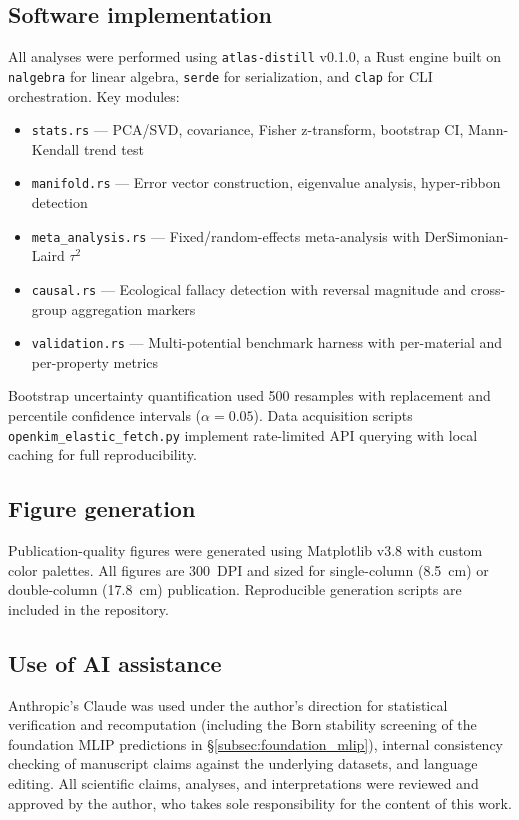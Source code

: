 \documentclass[twocolumn,9pt]{extarticle}
\begin{document}
\subsection{Software implementation}

All analyses were performed using \texttt{atlas-distill} v0.1.0, a Rust engine built on \texttt{nalgebra} for linear algebra, \texttt{serde} for serialization, and \texttt{clap} for CLI orchestration. Key modules:
\begin{itemize}
\item \texttt{stats.rs} --- PCA/SVD, covariance, Fisher z-transform, bootstrap CI, Mann-Kendall trend test
\item \texttt{manifold.rs} --- Error vector construction, eigenvalue analysis, hyper-ribbon detection
\item \texttt{meta\_analysis.rs} --- Fixed/random-effects meta-analysis with DerSimonian-Laird $\tau^2$
\item \texttt{causal.rs} --- Ecological fallacy detection with reversal magnitude and cross-group aggregation markers
\item \texttt{validation.rs} --- Multi-potential benchmark harness with per-material and per-property metrics
\end{itemize}

Bootstrap uncertainty quantification used 500 resamples with replacement and percentile confidence intervals ($\alpha = 0.05$). Data acquisition scripts \texttt{openkim\_elastic\_fetch.py} implement rate-limited API querying with local caching for full reproducibility.

\subsection{Figure generation}

Publication-quality figures were generated using Matplotlib v3.8 with custom color palettes. All figures are 300~DPI and sized for single-column (8.5~cm) or double-column (17.8~cm) publication. Reproducible generation scripts are included in the repository.

\subsection{Use of AI assistance}

Anthropic's Claude was used under the author's direction for statistical verification and recomputation (including the Born stability screening of the foundation MLIP predictions in \S\ref{subsec:foundation_mlip}), internal consistency checking of manuscript claims against the underlying datasets, and language editing. All scientific claims, analyses, and interpretations were reviewed and approved by the author, who takes sole responsibility for the content of this work.
\end{document}
